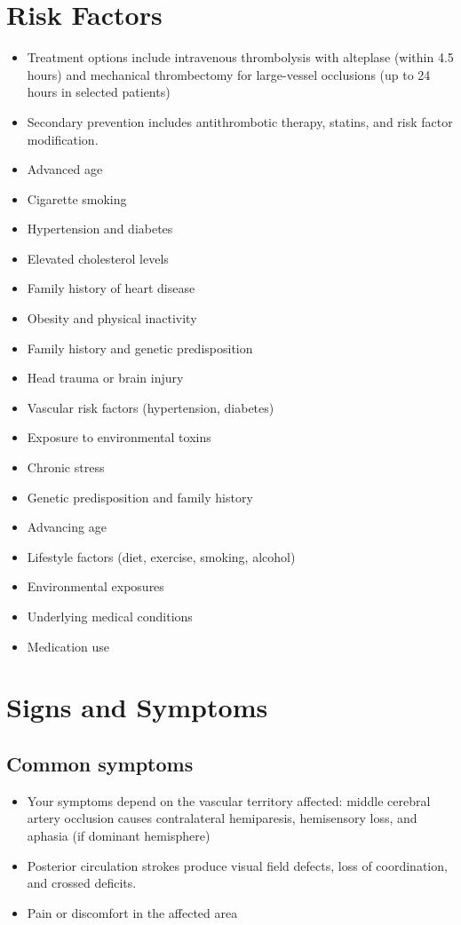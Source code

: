 \section{Risk Factors}
\begin{itemize}[noitemsep]
  \item Treatment options include intravenous thrombolysis with alteplase (within 4.5 hours) and mechanical thrombectomy for large-vessel occlusions (up to 24 hours in selected patients)
  \item Secondary prevention includes antithrombotic therapy, statins, and risk factor modification.
  \item Advanced age
  \item Cigarette smoking
  \item Hypertension and diabetes
  \item Elevated cholesterol levels
  \item Family history of heart disease
  \item Obesity and physical inactivity
  \item Family history and genetic predisposition
  \item Head trauma or brain injury
  \item Vascular risk factors (hypertension, diabetes)
  \item Exposure to environmental toxins
  \item Chronic stress
  \item Genetic predisposition and family history
  \item Advancing age
  \item Lifestyle factors (diet, exercise, smoking, alcohol)
  \item Environmental exposures
  \item Underlying medical conditions
  \item Medication use
\end{itemize}
\section{Signs and Symptoms}
\subsection{Common symptoms}
\begin{itemize}[noitemsep]
  \item Your symptoms depend on the vascular territory affected: middle cerebral artery occlusion causes contralateral hemiparesis, hemisensory loss, and aphasia (if dominant hemisphere)
  \item Posterior circulation strokes produce visual field defects, loss of coordination, and crossed deficits.
  \item Pain or discomfort in the affected area
  \end{itemize}
